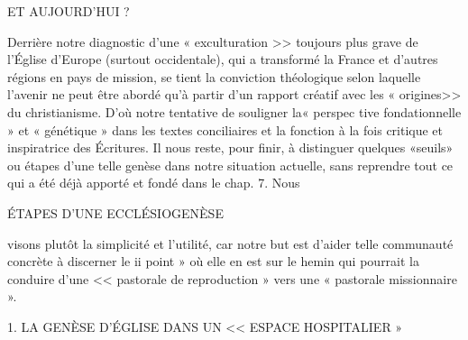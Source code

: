 ET AUJOURD'HUI ?

Derrière notre diagnostic d'une « exculturation >> toujours plus grave de l'Église d'Europe (surtout occidentale), qui a transformé la France et d'autres régions en pays de mission, se tient la conviction théologique selon laquelle l'avenir ne peut être abordé qu'à partir d'un rapport créatif avec les « origines>> du christianisme. D'où notre tentative de souligner la« perspec­ tive fondationnelle » et « génétique » dans les textes conciliaires et la fonction à la fois critique et inspiratrice des Écritures. Il nous reste, pour finir, à distinguer quelques «seuils» ou étapes d'une telle genèse dans notre situation actuelle, sans reprendre tout ce qui a été déjà apporté et fondé dans le chap. 7. Nous
 
ÉTAPES D'UNE ECCLÉSIOGENÈSE

visons plutôt la simplicité et l'utilité, car notre but est d'aider telle communauté concrète à discerner le ii point » où elle en est sur le hemin qui pourrait la conduire d'une << pastorale de reproduction » vers une « pastorale missionnaire ».

1.	LA GENÈSE D'ÉGLISE
DANS UN << ESPACE HOSPITALIER »

